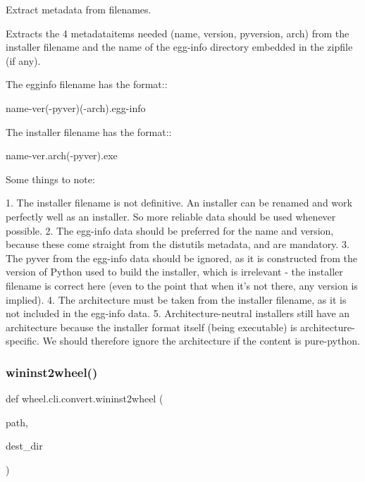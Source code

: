 \begin{DoxyVerb}Extract metadata from filenames.

Extracts the 4 metadataitems needed (name, version, pyversion, arch) from
the installer filename and the name of the egg-info directory embedded in
the zipfile (if any).

The egginfo filename has the format::

    name-ver(-pyver)(-arch).egg-info

The installer filename has the format::

    name-ver.arch(-pyver).exe

Some things to note:

1. The installer filename is not definitive. An installer can be renamed
   and work perfectly well as an installer. So more reliable data should
   be used whenever possible.
2. The egg-info data should be preferred for the name and version, because
   these come straight from the distutils metadata, and are mandatory.
3. The pyver from the egg-info data should be ignored, as it is
   constructed from the version of Python used to build the installer,
   which is irrelevant - the installer filename is correct here (even to
   the point that when it's not there, any version is implied).
4. The architecture must be taken from the installer filename, as it is
   not included in the egg-info data.
5. Architecture-neutral installers still have an architecture because the
   installer format itself (being executable) is architecture-specific. We
   should therefore ignore the architecture if the content is pure-python.
\end{DoxyVerb}
 \mbox{\label{namespacewheel_1_1cli_1_1convert_a1f06b050e440ed22143d63e25e295559}} 
\subsubsection{\texorpdfstring{wininst2wheel()}{wininst2wheel()}}
{\footnotesize\ttfamily def wheel.\+cli.\+convert.\+wininst2wheel (\begin{DoxyParamCaption}\item[{}]{path,  }\item[{}]{dest\+\_\+dir }\end{DoxyParamCaption})}



